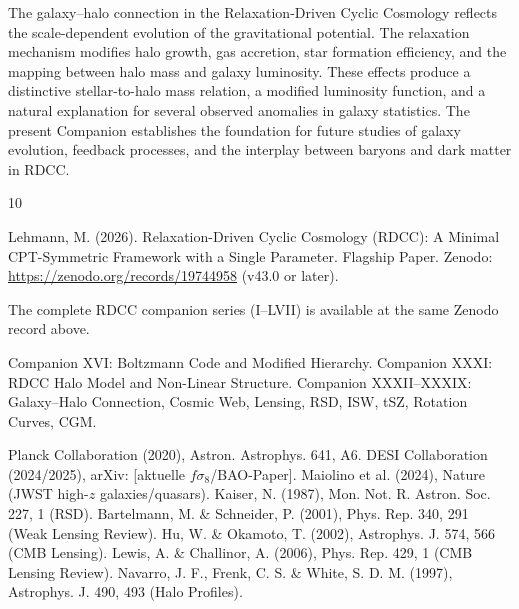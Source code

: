 \documentclass[11pt,a4paper]{article}
\begin{document}
The galaxy–halo connection in the Relaxation-Driven Cyclic Cosmology reflects the 
scale-dependent evolution of the gravitational potential. The relaxation mechanism 
modifies halo growth, gas accretion, star formation efficiency, and the mapping 
between halo mass and galaxy luminosity. These effects produce a distinctive 
stellar-to-halo mass relation, a modified luminosity function, and a natural 
explanation for several observed anomalies in galaxy statistics. The present 
Companion establishes the foundation for future studies of galaxy evolution, 
feedback processes, and the interplay between baryons and dark matter in RDCC.


\begin{thebibliography}{10}

 Lehmann, M. (2026). Relaxation-Driven Cyclic Cosmology (RDCC): A Minimal CPT-Symmetric Framework with a Single Parameter. Flagship Paper. Zenodo: \url{https://zenodo.org/records/19744958} (v43.0 or later).

 The complete RDCC companion series (I--LVII) is available at the same Zenodo record above.

 Companion XVI: Boltzmann Code and Modified Hierarchy.
 Companion XXXI: RDCC Halo Model and Non-Linear Structure.
 Companion XXXII--XXXIX: Galaxy--Halo Connection, Cosmic Web, Lensing, RSD, ISW, tSZ, Rotation Curves, CGM.

 Planck Collaboration (2020), Astron. Astrophys. 641, A6.
 DESI Collaboration (2024/2025), arXiv: [aktuelle $f\sigma_8$/BAO-Paper].
 Maiolino et al. (2024), Nature (JWST high-$z$ galaxies/quasars).
 Kaiser, N. (1987), Mon. Not. R. Astron. Soc. 227, 1 (RSD).
 Bartelmann, M. \& Schneider, P. (2001), Phys. Rep. 340, 291 (Weak Lensing Review).
 Hu, W. \& Okamoto, T. (2002), Astrophys. J. 574, 566 (CMB Lensing).
 Lewis, A. \& Challinor, A. (2006), Phys. Rep. 429, 1 (CMB Lensing Review).
 Navarro, J. F., Frenk, C. S. \& White, S. D. M. (1997), Astrophys. J. 490, 493 (Halo Profiles).

\end{thebibliography}
\end{document}
